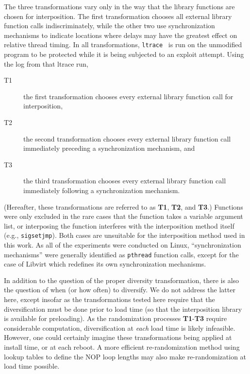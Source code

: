 The three transformations vary only in the way that the library functions are chosen for interposition.
The first transformation chooses all external library function calls indiscriminately, while the other two use synchronization mechanisms to indicate locations where delays may have the greatest effect on relative thread timing.
In all transformations, \texttt{ltrace}~\cite{cespedesltrace} is run on the unmodified program to be protected while it is being subjected to an exploit attempt.
Using the log from that ltrace run,
\begin{description}
	\item[T1] the first transformation chooses every external library function call for interposition,
	\item[T2] the second transformation chooses every external library function call immediately preceding a synchronization mechanism, and
	\item[T3] the third transformation chooses every external library function call immediately following a synchronization mechanism.
\end{description}
(Hereafter, these transformations are referred to as \textbf{T1}, \textbf{T2}, and \textbf{T3}.)
Functions were only excluded in the rare cases that the function takes a
variable argument list, or interposing the function interferes with the
interposition method itself (e.g., \texttt{sigsetjmp}).
Both cases are unsuitable for the interposition method used in this work.
As all of the experiments were conducted on Linux, ``synchronization
mechanisms'' were generally identified as \texttt{pthread} function calls, except for the case of Libvirt which redefines its own synchronization mechanisms.

In addition to the question of the proper diversity transformation, there is also the question of when (or how often) to diversify.
We do not address the latter here, except insofar as the transformations tested here require that the diversification must be done prior to load time (so that the interposition library is available for preloading).
As the randomization processes \textbf{T1}-\textbf{T3} require considerable computation, diversification at \textit{each} load time is likely infeasible.
However, one could certainly imagine these transformations being applied at install time, or at each reboot.
A more efficient re-randomization method using lookup tables to define the NOP loop lengths may also make re-randomization at load time possible.